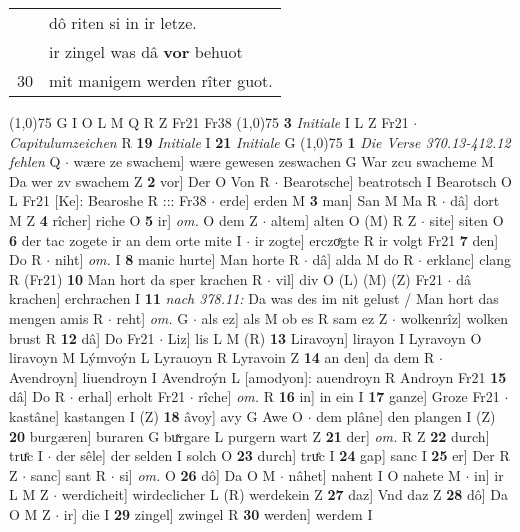 \documentclass[8pt,a4paper,notitlepage]{article}
\begin{document}
\begin{table}[ht]
\begin{minipage}[t]{0.5\linewidth}
\begin{tabular}{rl}
 & dô riten si in ir letze.\\ 
 & ir zingel was dâ \textbf{vor} behuot\\ 
30 & mit manigem werden rîter guot.\\ 
\end{tabular}
\scriptsize
\line(1,0){75} \newline
G I O L M Q R Z Fr21 Fr38 \newline
\line(1,0){75} \newline
\textbf{3} \textit{Initiale} I L Z Fr21   $\cdot$ \textit{Capitulumzeichen} R  \textbf{19} \textit{Initiale} I  \textbf{21} \textit{Initiale} G  \newline
\line(1,0){75} \newline
\textbf{1} \textit{Die Verse 370.13-412.12 fehlen} Q   $\cdot$ wære ze swachem] wære gewesen zeswachen G War zcu swacheme M Da wer zv swachem Z \textbf{2} vor] Der O Von R  $\cdot$ Bearotsche] beatrotsch I Bearotsch O L Fr21 [Ke]: Bearoshe R ::: Fr38  $\cdot$ erde] erden M \textbf{3} man] San M Ma R  $\cdot$ dâ] dort M Z \textbf{4} rîcher] riche O \textbf{5} ir] \textit{om.} O dem Z  $\cdot$ altem] alten O (M) R Z  $\cdot$ site] siten O \textbf{6} der tac zogete ir an dem orte mite I  $\cdot$ ir zogte] erczoͯgte R ir volgt Fr21 \textbf{7} den] Do R  $\cdot$ niht] \textit{om.} I \textbf{8} manic hurte] Man horte R  $\cdot$ dâ] alda M do R  $\cdot$ erklanc] clang R (Fr21) \textbf{10} Man hort da sper krachen R  $\cdot$ vil] div O (L) (M) (Z) Fr21  $\cdot$ dâ krachen] erchrachen I \textbf{11} \textit{nach 378.11:} Da was des im nit gelust / Man hort das mengen amis R   $\cdot$ reht] \textit{om.} G  $\cdot$ als ez] als M ob es R sam ez Z  $\cdot$ wolkenrîz] wolken brust R \textbf{12} dâ] Do Fr21  $\cdot$ Liz] lis L M (R) \textbf{13} Liravoyn] lirayon I Lyravoyn O liravoyn M Lýmvoýn L Lyrauoyn R Lyravoin Z \textbf{14} an den] da dem R  $\cdot$ Avendroyn] liuendroyn I Avendroýn L [amodyon]: auendroyn R Androyn Fr21 \textbf{15} dâ] Do R  $\cdot$ erhal] erholt Fr21  $\cdot$ rîche] \textit{om.} R \textbf{16} in] in ein I \textbf{17} ganze] Groze Fr21  $\cdot$ kastâne] kastangen I (Z) \textbf{18} âvoy] avy G Awe O  $\cdot$ dem plâne] den plangen I (Z) \textbf{20} burgæren] buraren G buͯrgare L purgern wart Z \textbf{21} der] \textit{om.} R Z \textbf{22} durch] truͤc I  $\cdot$ der sêle] der selden I solch O \textbf{23} durch] truͤc I \textbf{24} gap] sanc I \textbf{25} er] Der R Z  $\cdot$ sanc] sant R  $\cdot$ si] \textit{om.} O \textbf{26} dô] Da O M  $\cdot$ nâhet] nahent I O nahete M  $\cdot$ in] ir L M Z  $\cdot$ werdicheit] wirdeclicher L (R) werdekein Z \textbf{27} daz] Vnd daz Z \textbf{28} dô] Da O M Z  $\cdot$ ir] die I \textbf{29} zingel] zwingel R \textbf{30} werden] werdem I \newline

\end{minipage}
\end{table}
\end{document}
